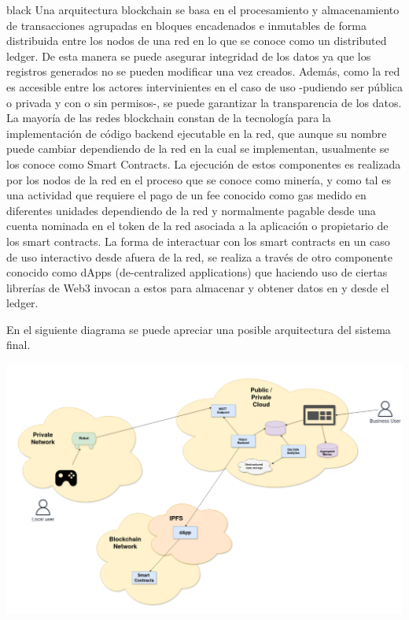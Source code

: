 \documentclass[
11pt, %
]{charter}
\begin{document}
\begin{consigna}{black}
Una arquitectura blockchain se basa en el procesamiento y almacenamiento de transacciones agrupadas en bloques encadenados e inmutables de forma distribuida entre los nodos de una red en lo que se conoce como un distributed ledger. De esta manera se puede asegurar integridad de los datos ya que los registros generados no se pueden modificar una vez creados. Además, como la red es accesible entre los actores intervinientes en el caso de uso -pudiendo ser pública o privada y con o sin permisos-, se puede garantizar la transparencia de los datos.
La mayoría de las redes blockchain constan de la tecnología para la implementación de código backend ejecutable en la red, que aunque su nombre puede cambiar dependiendo de la red en la cual se implementan, usualmente se los conoce como Smart Contracts. La ejecución de estos componentes es realizada por los nodos de la red en el proceso que se conoce como minería, y como tal es una actividad que requiere el pago de un fee conocido como gas medido en diferentes unidades dependiendo de la red y normalmente pagable desde una cuenta nominada en el token de la red asociada a la aplicación o propietario de los smart contracts.
La  forma de interactuar con los smart contracts en un caso de uso interactivo desde afuera de la red, se realiza a través de otro componente conocido como dApps (de-centralized applications) que haciendo uso de ciertas librerías de Web3 invocan a estos para almacenar y obtener datos en y desde el ledger.

En el siguiente diagrama se puede apreciar una posible arquitectura del sistema final.



\begin{center}
  \includegraphics[scale=0.15]{Figuras/IoTProject-Page-1.drawio}
  \label{fig:esp32}
\end{center}





\end{consigna}
\end{document}
